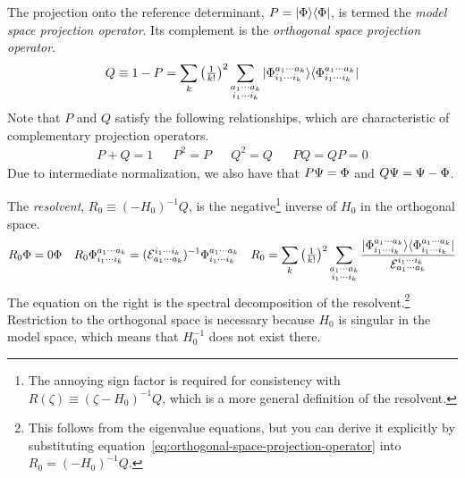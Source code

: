 \documentclass[11pt]{article}
\numberwithin{equation}{section}
\begin{document}
\begin{dfn}
The projection onto the reference determinant, $P=|\Phi \rangle\langle\Phi |$, is termed the \textit{model space projection operator}.
Its complement is the \textit{orthogonal space projection operator}.
\begin{align}
\label{eq:orthogonal-space-projection-operator}
  Q
\equiv
  1
-
  P
=
  \sum_k
  \left(
    \tfrac{1}{k!}
  \right)^2
  \sum_{\substack{a_1\cdots a_k\\i_1\cdots i_k}}
  |\Phi _{i_1\cdots i_k}^{a_1\cdots a_k}\rangle
  \langle\Phi _{i_1\cdots i_k}^{a_1\cdots a_k}|
\end{align}
Note that $P$ and $Q$ satisfy the following relationships, which are characteristic of complementary projection operators.
\begin{align}
  P
+
  Q
=
  1
&&
  P^2
=
  P
&&
  Q^2
=
  Q
&&
  PQ
=
  QP
=
  0
\end{align}
Due to intermediate normalization, we also have that
$
  P\Psi 
=
  \Phi 
$
and
$
  Q\Psi 
=
  \Psi 
-
  \Phi 
$.
\end{dfn}

\begin{samepage}
\begin{dfn}
The \textit{resolvent},
$
  R_0
\equiv
  (-H_0)^{-1}Q
$, is the negative\footnote{The annoying sign factor is required for consistency with $R(\zeta)\equiv(\zeta-H_0)^{-1}Q$, which is a more general definition of the resolvent.} inverse of $H_0$ in the orthogonal space.
\begin{align}
\label{eq:resolvent-spectral-decomposition}
  R_0
  \Phi 
=
  0
  \Phi 
&&
  R_0
  \Phi _{i_1\cdots i_k}^{a_1\cdots a_k}
=
  (\mathcal{E}_{a_1\cdots a_k}^{i_1\cdots i_k})^{-1}
  \Phi _{i_1\cdots i_k}^{a_1\cdots a_k}
&&
  R_0
=
  \sum_k
  \left(\tfrac{1}{k!}\right)^2
  \sum_{\substack{a_1\cdots a_k\\i_1\cdots i_k}}
  \frac {
    |\Phi _{i_1\cdots i_k}^{a_1\cdots a_k}\rangle
    \langle\Phi _{i_1\cdots i_k}^{a_1\cdots a_k}|
  }{
    \mathcal{E}_{a_1\cdots a_k}^{i_1\cdots i_k}
  }
\end{align}
The equation on the right is the spectral decomposition of the resolvent.\footnote{This follows from the eigenvalue equations, but you can derive it explicitly by substituting equation~\ref{eq:orthogonal-space-projection-operator} into $R_0=(-H_0)^{-1}Q$.}
Restriction to the orthogonal space is necessary because $H_0$ is singular in the model space, which means that $H_0^{-1}$ does not exist there.
\end{dfn}
\end{samepage}
\end{document}
